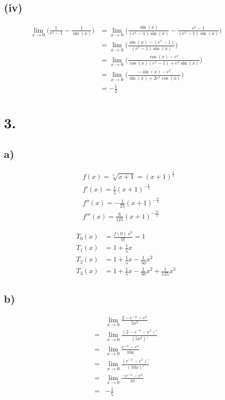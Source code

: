 \documentclass[a4paper]{scrartcl}
\begin{document}
\subsection{(iv)}
\begin{align}
\lim\limits_{x\to 0}\bigg(\frac{1}{e^x-1}-\frac{1}{\sin(x)}\bigg)&=\lim\limits_{x\to 0}\bigg(\frac{\sin(x)}{(e^x-1)\sin(x)}-\frac{e^x-1}{(e^x-1)\sin(x)}\bigg)\\
	&=\lim\limits_{x\to 0}\bigg(\frac{\sin(x)-(e^x-1)}{(e^x-1)\sin(x)}\bigg)\\
	&=\lim\limits_{x\to 0}\bigg(\frac{\cos(x)-e^x}{\cos(x)(e^x-1)+e^x\sin(x)}\bigg)\\
	&=\lim\limits_{x\to 0}\bigg(\frac{-\sin(x)-e^x}{\sin(x)+2e^x\cos(x)}\bigg)\\
	&=-\frac{1}{2}
\end{align}
\section{3.}
\subsection{a)}
\begin{align}
&f(x) = \sqrt[5]{x+1} = (x+1)^{\frac 1 5} \\
&f'(x) = \frac 1 5 (x+1)^{-\frac 1 5} \\
&f''(x) = -\frac 1 {25} (x+1)^{-\frac 6 5} \\
&f'''(x) = \frac 6 {125} (x+1)^{-\frac {11} 5}
\end{align}

\begin{align}
T_0(x)& = \frac{f(0)\ x^0}{0!} = 1 \\
T_1(x)& = 1 + \frac 1 5 x \\
T_2(x)& = 1 + \frac 1 5 x - \frac 1 {50} x^2 \\
T_3(x)& = 1 + \frac 1 5 x - \frac 1 {50} x^2 + \frac 1 {125} x^3
\end{align}

\subsection{b)}
\begin{align}
&\lim_{x\to 0} \frac{2-e^{-x}-e^x}{5x^2} \\
= &\lim_{x\to 0} \frac{(2-e^{-x}-e^x)'}{(5x^2)'} \\
= &\lim_{x\to 0} \frac{e^{-x}-e^x}{10x} \\
= &\lim_{x\to 0} \frac{(e^{-x}-e^x)'}{(10x)'} \\
= &\lim_{x\to 0} \frac{-e^{-x}-e^x}{10} \\
= &-\frac{1}{5}
\end{align}
\end{document}
